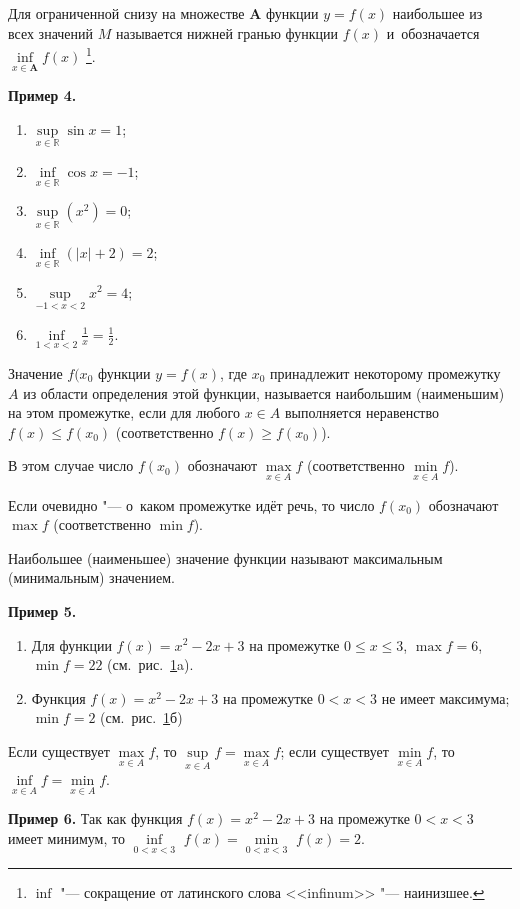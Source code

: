 Для ограниченной снизу на множестве $\mathbf{A}$ функции $y = f(x)$
наибольшее из всех значений $M$ называется нижней гранью функции $f(x)$
и~обозначается $\inf\limits_{x \in \mathbf{A}} f(x)$
\footnote{$\inf$ "--- сокращение от латинского слова <<infinum>>
"--- наинизшее.}.

\textbf{Пример 4.}
\begin{enumerate}
\item $\sup\limits_{x \in \mathbb{R}} \sin x = 1$;
\item $\inf\limits_{x \in \mathbb{R}} \cos x = -1$;
\item $\sup\limits_{x \in \mathbb{R}} (x^{2}) = 0$;
\item $\inf\limits_{x \in \mathbb{R}} (|x| + 2) = 2$;
\item $\sup\limits_{-1<x<2} x^{2} = 4$;
\item $\displaystyle \inf\limits_{1<x<2} \frac{1}{x} = \frac{1}{2}$.
\end{enumerate}

\begin{Def}
Значение $f(x_{0}$ функции $y = f(x)$, где $x_{0}$ принадлежит
некоторому промежутку $A$ из области определения этой функции,
называется наибольшим (наименьшим) на этом промежутке,
если для любого $x \in A$ выполняется неравенство $f(x) \leqslant f(x_{0})$
(соответственно $f(x) \geqslant f(x_{0})$).

В этом случае число $f(x_{0})$ обозначают $\max\limits_{x \in A} f$
(соответственно $\min\limits_{x \in A} f$).
\end{Def}

Если очевидно "--- о~каком промежутке идёт речь, то число $f(x_{0})$
обозначают $\max f$ (соответственно $\min f$).

Наибольшее (наименьшее) значение функции называют максимальным
(минимальным) значением.

\textbf{Пример 5.}
\begin{enumerate}
\item Для функции $f(x) = x^{2} - 2x + 3$ на промежутке
$0 \leqslant x \leqslant 3$,
\linebreak ${\max f = 6}$, $\min f = 22$
(см.\ рис.\ \ref{fig_1_5_12}a).

\item Функция $f(x) = x^{2} - 2x + 3$ на промежутке
$0 < x <3$ не имеет максимума; $\min f = 2$ (см.\ рис.\ \ref{fig_1_5_12}б)
\end{enumerate}

\begin{figure}\label{fig_1_5_12}
\end{figure}

Если существует $\max\limits_{x \in A} f$,
то $\sup\limits_{x \in A} f = \max\limits_{x \in A} f$;
если существует $\min\limits_{x \in A} f$,
то $\inf\limits_{x \in A} f = \min\limits_{x \in A} f$.

\textbf{Пример 6.}
Так как функция $f(x) = x^{2} - 2x + 3$ на промежутке 
\linebreak ${0 < x < 3}$
имеет минимум, то
$\inf\limits_{0<x<3}$ $f(x) = \min\limits_{0<x<3}$ $f(x) = 2$.

